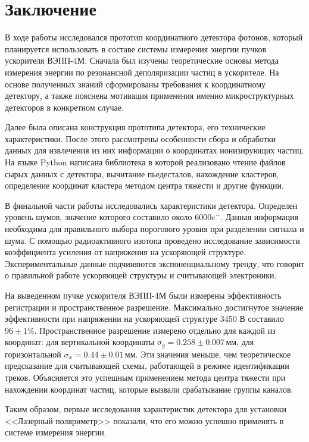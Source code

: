 \chapter*{Заключение}
В ходе работы исследовался прототип координатного детектора фотонов, который планируется использовать в составе системы измерения энергии пучков ускорителя ВЭПП-4М. Сначала был изучены теоретические основы метода измерения энергии по резонансной деполяризации частиц в ускорителе. На основе полученных знаний сформированы требования к координатному детектору, а также  пояснена мотивация применения именно микроструктурных детекторов в конкретном случае. 
\par Далее была описана конструкция прототипа детектора, его технические характеристики. После этого рассмотрены особенности сбора и обработки данных для извлечения из них информации о координатах ионизирующих частиц. На языке Python написана библиотека в которой реализовано чтение файлов сырых данных с детектора, вычитание пьедесталов, нахождение кластеров, определение координат кластера методом центра тяжести и другие функции. 
\par В финальной части работы исследовались характеристики детектора. Определен уровень шумов, значение которого составило около $6000 e^-$. Данная информация необходима для правильного выбора порогового уровня при разделении сигнала и шума. С помощью радиоактивного изотопа проведено исследование зависимости коэффициента усиления от напряжения на ускоряющей структуре. Экспериментальные данные подчиняются экспоненциальному тренду, что говорит о правильной работе ускоряющей структуры и считывающей электроники. 
\par На выведенном пучке ускорителя ВЭПП-4М были измерены эффективность регистрации и пространственное разрешение. Максимально достигнутое значение эффективности при напряжении на ускоряющей структуре 3450 В составило $96 \pm 1\%$. Пространственное разрешение измерено отдельно для каждой из координат: для вертикальной координаты $\sigma_y = 0.258\pm0.007$\,мм, для горизонтальной $\sigma_x = 0.44\pm0.01$\,мм. Эти значения меньше, чем теоретическое предсказание для считывающей схемы, работающей в режиме идентификации треков. Объясняется это успешным применением метода центра тяжести при нахождении координат частиц, которые вызвали срабатывание группы каналов. 
\par Таким образом, первые исследования характеристик детектора для установки <<Лазерный поляриметр>> показали, что его можно успешно применять в системе измерения энергии. 